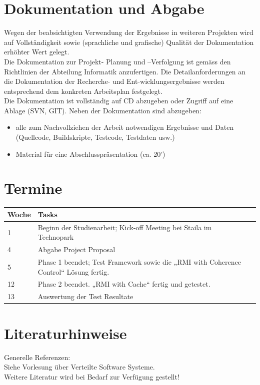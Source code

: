 \documentclass{article}
\begin{document}
\section{Dokumentation und Abgabe}
Wegen der beabsichtigten Verwendung der Ergebnisse in weiteren Projekten wird auf Vollständigkeit sowie (sprachliche und grafische) Qualität der Dokumentation erhöhter Wert gelegt.\\
Die Dokumentation zur Projekt- Planung und –Verfolgung ist gemäss den Richtlinien der Abteilung Informatik anzufertigen. Die Detailanforderungen an die Dokumentation der Recherche- und Ent-wicklungsergebnisse werden entsprechend dem konkreten Arbeitsplan festgelegt.\\
Die Dokumentation ist vollständig auf CD abzugeben oder Zugriff auf eine Ablage (SVN, GIT).
Neben der Dokumentation sind abzugeben:
\begin{itemize}
\item alle zum Nachvollziehen der Arbeit notwendigen Ergebnisse und Daten (Quellcode, Buildskripte, Testcode, Testdaten usw.)
\item Material für eine Abschlusspräsentation (ca. 20’)
\end{itemize}

\section{Termine}

\begin{tabular}{l|ll}
Woche & Tasks \\ \hline
1 & Beginn der Studienarbeit; Kick-off Meeting bei Staila im Technopark \\
4 & Abgabe Project Proposal\\
5 & Phase 1 beendet; Test Framework sowie die „RMI with Coherence Control“ Lösung fertig.\\
12 &  Phase 2 beendet. „RMI with Cache“ fertig und getestet. \\
13 & Auswertung der Test Resultate
\end{tabular}

\section{Literaturhinweise}
Generelle Referenzen:\\
Siehe Vorlesung über Verteilte Software Systeme.\\
Weitere Literatur wird bei Bedarf zur Verfügung gestellt!
\end{document}
